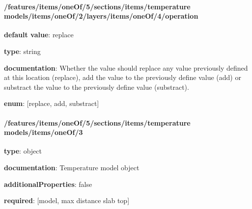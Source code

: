 \begin{itemized}
\end{itemized}\paragraph{/features/items/oneOf/5/sections/items/temperature models/items/oneOf/2/layers/items/oneOf/4/operation} \begin{itemized}
\item {\bf default value}: replace
\item {\bf type}: string
\item {\bf documentation}: Whether the value should replace any value previously defined at this location (replace), add the value to the previously define value (add) or substract the value to the previously define value (substract).
\item {\bf enum}: [replace, add, substract]\end{itemized}\paragraph{/features/items/oneOf/5/sections/items/temperature models/items/oneOf/3} \begin{itemized}
\item {\bf type}: object
\item {\bf documentation}: Temperature model object
\item {\bf additionalProperties}: false
\item {\bf required}: [model, max distance slab top]\end{itemized}
